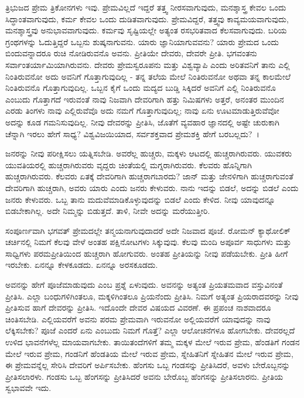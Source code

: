 ತ್ರಿಭುಜದ ಪ್ರೇಮ ತ್ರಿಕೋನಗಳು ಇವು. ಪ್ರೇಮವಿಲ್ಲದೆ ಇದ್ದರೆ ತತ್ತ್ವ ನೀರಸವಾಗುವುದು, ಮನಶ್ಶಾಸ್ತ್ರ ಕೇವಲ ಒಂದು ಸಿದ್ಧಾಂತವಾಗುವುದು, ಕರ್ಮ ಕೇವಲ ಒಂದು ದುಡಿತವಾಗುವುದು. ಪ್ರೇಮವಿದ್ದರೆ, ತತ್ತ್ವವು ಕಾವ್ಯಮಯವಾಗುವುದು, ಮನಶ್ಶಾಸ್ತ್ರವು ಅನುಭಾವವಾಗುವುದು. ಕರ್ಮವು ಸೃಷ್ಟಿಯಲ್ಲೇ ಅತ್ಯಂತ ರಸಭರಿತವಾದ ಕೆಲಸವಾಗುವುದು. ಬರಿಯ ಗ್ರಂಥಗಳನ್ನು ಓದುತ್ತಿದ್ದರೆ ಒಬ್ಬನು ಶುಷ್ಕನಾಗುವನು. ಯಾರು ಜ್ಞಾನಿಯಾಗುವವನು? ಯಾರು ಪ್ರೇಮದ ಒಂದು ಬಿಂದುವನ್ನಾದರೂ ರುಚಿ ನೋಡಿರುವನೊ ಅವನು. ಪ್ರೀತಿಯೇ ದೇವರು, ದೇವರೇ ಪ್ರೀತಿ. ಭಗವಂತನು ಸರ್ವಾಂತರ್ಯಾಮಿಯಾಗಿರುವನು. ದೇವರು ಪ್ರೇಮಸ್ವರೂಪನು ಮತ್ತು ವಿಶ್ವವ್ಯಾಪಿ ಎಂದು ಅರಿತವನಿಗೆ ತಾನು ಎಲ್ಲಿ ನಿಂತಿರುವನೋ ಅದು ಅವನಿಗೆ ಗೊತ್ತಾಗುವುದಿಲ್ಲ - ತನ್ನ ತಲೆಯ ಮೇಲೆ ನಿಂತಿರುವನೋ ಅಥವಾ ತನ್ನ ಕಾಲಮೇಲೆ ನಿಂತಿರುವನೊ ಗೊತ್ತಾಗುವುದಿಲ್ಲ. ಒಬ್ಬನ ಕೈಗೆ ಒಂದು ಮದ್ಯದ ಬುಡ್ಡಿ ಸಿಕ್ಕಿದರೆ ಅವನಿಗೆ ಎಲ್ಲಿ ನಿಂತಿರುವನೊ ಎಂಬುದು ಗೊತ್ತಾಗದೆ ಇರುವಂತೆ ನಾವು ನಿಜವಾಗಿ ದೇವರಿಗಾಗಿ ಹತ್ತು ನಿಮಿಷಗಳು ಅತ್ತರೆ, ಅನಂತರ ಮುಂದಿನ ಎರಡು ತಿಂಗಳು ನಾವು ಎಲ್ಲಿರುವೆವೊ ಅದು ನಮಗೆ ಗೊತ್ತಾಗುವುದಿಲ್ಲ; ನಾವು ಏನು ಊಟಮಾಡುತ್ತಿರುವೆವೋ ಅದನ್ನು ಕೂಡ ಗಮನಿಸುವುದಿಲ್ಲ. ನೀವು ದೇವರನ್ನು ಪ್ರೀತಿಸಿ, ಜೊತೆಗೆ ವ್ಯವಹಾರ ಜ್ಞಾನದಲ್ಲಿ ಅಷ್ಟೇ ಚುರುಕಾಗಿ ಚೆನ್ನಾಗಿ ಇರಲು ಹೇಗೆ ಸಾಧ್ಯ? ವಿಶ್ವವಿಜಯಿಯಾದ, ಸರ್ವಶಕ್ತವಾದ ಪ್ರೇಮಶಕ್ತಿ ಹೇಗೆ ಬರಬಲ್ಲದು?~।

ಜನರನ್ನು ನೀವು ಪರೀಕ್ಷಿಸಲು ಯತ್ನಿಸಬೇಡಿ. ಅವರೆಲ್ಲ ಹುಚ್ಚರು, ಮಕ್ಕಳು ಆಟದಲ್ಲಿ ಹುಚ್ಚರಾಗಿರುವರು. ಯುವಕರು ಯುವತಿಯರಲ್ಲಿ ಹುಚ್ಚರಾಗಿರುವರು ವೃದ್ದರು ಚಿಂತೆಯಲ್ಲಿ ಮಗ್ನರಾಗಿರುವರು. ಕೆಲವರು ಹೊನ್ನಿಗಾಗಿ ಹುಚ್ಚರಾಗಿರುವರು. ಕೆಲವರು ಏತಕ್ಕೆ ದೇವರಿಗಾಗಿ ಹುಚ್ಚರಾಗಬಾರದು? ಜಾನ್ ಮತ್ತು ಜೇನಳಿಗಾಗಿ ಹುಚ್ಚರಾಗುವಂತೆ ದೇವರಿಗಾಗಿ ಹುಚ್ಚರಾಗಿ, ಅವರು ಯಾರು ಎಂದು ಜನರು ಕೇಳುವರು. ನಾನು ಇದನ್ನು ಬಿಡಲೆ, ಅದನ್ನು ಬಿಡಲೆ ಎಂದು ಜನರು ಕೇಳುವರು. ಒಬ್ಬ ತಾನು ಮದುವೆಮಾಡಿಕೊಳ್ಳುವುದನ್ನು ಬಿಡಲೆ ಎಂದು ಕೇಳಿದ. ನೀವು ಯಾವುದನ್ನೂ ಬಿಡಬೇಕಾಗಿಲ್ಲ. ಅದೇ ನಿಮ್ಮನ್ನು ಬಿಡುತ್ತದೆ. ತಾಳಿ, ನೀವೇ ಅದನ್ನು ಮರೆಯುತ್ತೀರಿ.

ಸಂಪೂರ್ಣವಾಗಿ ಭಗವತ್ ಪ್ರೇಮದಲ್ಲೇ ತನ್ಮಯನಾಗುವುದಾದರೆ ಅದೇ ನಿಜವಾದ ಪೂಜೆ. ರೋಮನ್ ಕ್ಯಾಥೋಲಿಕ್ ಚರ್ಚಿನಲ್ಲಿ ನಿಮಗೆ ಕೆಲವು ವೇಳೆ ಅಂತಹ ಪಕ್ಷಿನೋಟಗಳು ಸಿಕ್ಕುವುವು. ಕೆಲವು ಮಂದಿ ಅಪೂರ್ವ ಸಾಧುಗಳು ಮತ್ತು ಸಾಧ್ವಿಗಳು ಪರಮಪ್ರೀತಿಯಿಂದ ಹುಚ್ಚರಾಗಿ ಹೋಗುವರು. ಅಂತಹ ಪ್ರೀತಿಯನ್ನು ನೀವು ಪಡೆಯಬೇಕು. ಪ್ರೀತಿ ಹೀಗೆ ಇರಬೇಕು. ಏನನ್ನೂ ಕೇಳಕೂಡದು. ಏನನ್ನೂ ಅರಸಕೂಡದು.

ಅವನನ್ನು ಹೇಗೆ ಪೂಜೆಮಾಡುವುದು ಎಂಬ ಪ್ರಶ್ನೆ ಏಳುವುದು. ಅವನನ್ನು ಅತ್ಯಂತ ಪ್ರಿಯತಮವಾದ ವಸ್ತುವಿನಂತೆ ಪ್ರೀತಿಸಿ. ಎಲ್ಲಾ ಬಂಧುಗಳಿಗಿಂತಲೂ, ಮಕ್ಕಳಿಗಿಂತಲೂ ಪ್ರಿಯನೆಂದು ಪ್ರೀತಿಸಿ. ನಿಮಗೆ ಅತ್ಯಂತ ಪ್ರಿಯರಾದವರನ್ನು ನೀವು ಪ್ರೀತಿಸುವ ಹಾಗೆ ದೇವರನ್ನು ಪ್ರೀತಿಸಿ. ಇದೊಂದೇ ದೇವರ ವಿಷಯದ ವಿವರಣೆ. ಈ ಪ್ರಪಂಚ ನಾಶವಾದರೂ ಚಿಂತಿಸಬೇಡಿ. ಎಲ್ಲಿಯವರೆಗೆ ಅವನು ಪರಮ ಪ್ರೇಮವಾಗಿ ಇರುವನೋ ಅಲ್ಲಿಯವರೆಗೆ ಯಾವುದನ್ನು ನಾವು ಲೆಕ್ಕಿಸಬೇಕು? ಪೂಜೆ ಎಂದರೆ ಏನು ಎಂಬುದು ನಿಮಗೆ ಗೊತ್ತೆ? ಎಲ್ಲಾ ಆಲೋಚನೆಗಳೂ ಹೋಗಬೇಕು. ದೇವರಲ್ಲದೆ ಉಳಿದ ಭಾವನೆಗಳೆಲ್ಲ ಮಾಯವಾಗಬೇಕು. ತಾಯಿತಂದೆಗಳಿಗೆ ತಮ್ಮ ಮಕ್ಕಳ ಮೇಲೆ ಇರುವ ಪ್ರೇಮ, ಹೆಂಡತಿಗೆ ಗಂಡನ ಮೇಲೆ ಇರುವ ಪ್ರೇಮ, ಗಂಡನಿಗೆ ಹೆಂಡತಿಯ ಮೇಲೆ ಇರುವ ಪ್ರೇಮ, ಸ್ನೇಹಿತನಿಗೆ ಸ್ನೇಹಿತನ ಮೇಲೆ ಇರುವ ಪ್ರೇಮ, ಈ ಪ್ರೇಮವನ್ನೆಲ್ಲ ಸೇರಿಸಿ ದೇವರಿಗೆ ಅರ್ಪಿಸಬೇಕು. ಹೆಂಗಸು ಒಬ್ಬ ಗಂಡಸನ್ನು ಪ್ರೀತಿಸಿದರೆ, ಅವಳು ಬೇರೊಬ್ಬನನ್ನು ಪ್ರೀತಿಸಲಾರಳು. ಗಂಡಸು ಒಬ್ಬ ಹೆಂಗಸನ್ನು ಪ್ರೀತಿಸಿದರೆ ಅವನು ಬೇರೊಬ್ಬ ಹೆಂಗಸನ್ನು ಪ್ರೀತಿಸಲಾರನು. ಪ್ರೀತಿಯ ಸ್ವಭಾವವೇ ಇದು.

